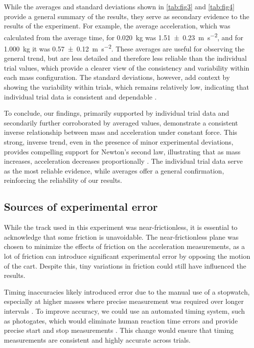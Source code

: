 ﻿\documentclass[reprint,amsmath,amssymb,aps]{revtex4-2}
\begin{document}
While the averages and standard deviations shown in \cref{tab:fig3} and \ref{tab:fig4} provide a general summary of the results, they serve as secondary evidence to the results of the experiment. For example, the average acceleration, which was calculated from the average time, for \qty{0.020}{\kilo\gram} was \qty{1.51\pm0.23}{\meter\per\second\squared}, and for \qty{1.000}{\kilo\gram} it was \qty{0.57\pm0.12}{\meter\per\second\squared}. These averages are useful for observing the general trend, but are less detailed and therefore less reliable than the individual trial values, which provide a clearer view of the consistency and variability within each mass configuration. The standard deviations, however, add context by showing the variability within trials, which remains relatively low, indicating that individual trial data is consistent and dependable \cite{starnes2015practice}.

To conclude, our findings, primarily supported by individual trial data and secondarily further corroborated by averaged values, demonstrate a consistent inverse relationship between mass and acceleration under constant force. This strong, inverse trend, even in the presence of minor experimental deviations, provides compelling support for Newton’s second law, illustrating that as mass increases, acceleration decreases proportionally \cite{knight2017physics}. The individual trial data serve as the most reliable evidence, while averages offer a general confirmation, reinforcing the reliability of our results.

\subsection{Sources of experimental error}
While the track used in this experiment was near-frictionless, it is essential to acknowledge that some friction is unavoidable. The near-frictionless plane was chosen to minimize the effects of friction on the acceleration measurements, as a lot of friction can introduce significant experimental error by opposing the motion of the cart. Despite this, tiny variations in friction could still have influenced the results.

Timing inaccuracies likely introduced error due to the manual use of a stopwatch, especially at higher masses where precise measurement was required over longer intervals \cite{hetzler2008reliability}. To improve accuracy, we could use an automated timing system, such as photogates, which would eliminate human reaction time errors and provide precise start and stop measurements \cite{taylor1997introduction}. This change would ensure that timing measurements are consistent and highly accurate across trials. 
\end{document}
